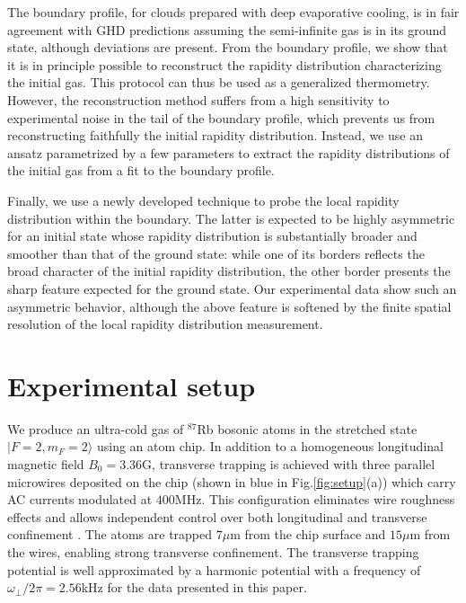 The boundary profile, for clouds prepared with deep evaporative cooling, is in fair agreement with GHD predictions assuming the semi-infinite gas is in its ground state, although deviations are present. From the boundary profile, we show that it is in principle possible to reconstruct the rapidity distribution characterizing the initial gas. This protocol can thus be used as a generalized thermometry. 
However, the reconstruction method suffers from a high sensitivity to experimental noise in the tail of the boundary profile, which prevents us from reconstructing faithfully the initial rapidity distribution. Instead, we use an ansatz parametrized by a few parameters to extract the rapidity distributions of the initial gas from a fit to the boundary profile. 

Finally, we use a newly developed technique \cite{dubois_probing_2024} to probe the local rapidity distribution within the boundary. The latter is expected to be highly asymmetric for an initial state whose rapidity distribution is substantially broader and 
smoother than that of the ground state: while one of its borders
reflects the broad character of the initial rapidity distribution, the other border
presents the sharp feature expected for the ground state. Our experimental data show such an asymmetric behavior, although the above feature is softened by the finite spatial resolution of the local rapidity distribution measurement.  


\section{Experimental setup}

We produce an ultra-cold gas of $^{87}$Rb bosonic atoms in the stretched state $|F=2,m_F=2 \rangle$ using an atom chip. In addition to a homogeneous longitudinal magnetic field $B_0 = 3.36 $G, transverse trapping is achieved with three parallel microwires deposited on the chip (shown in blue in Fig.\ref{fig:setup}(a)) which carry AC currents modulated at $400$MHz. This configuration eliminates wire roughness effects and allows independent control over both longitudinal and transverse confinement \cite{PhysRevLett.98.263201}. The atoms are trapped $7\mu$m from the chip surface and $15\mu$m from the wires, enabling strong transverse confinement. The transverse trapping potential is well approximated by a harmonic potential with a frequency of $\omega_{\perp}/ 2 \pi=2.56 $kHz for the data presented in this paper. 

